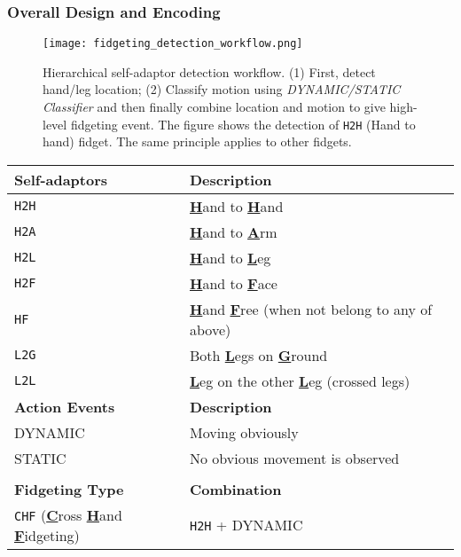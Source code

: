 \subsubsection{Overall Design and Encoding}
\begin{figure}[h]
    \centering
    \texttt{[image: fidgeting\_detection\_workflow.png]}
    \caption{Hierarchical self-adaptor detection workflow. (1) First, detect hand/leg location; (2) Classify motion using \textit{DYNAMIC/STATIC Classifier} and then finally combine location and motion to give high-level fidgeting event. The figure shows the detection of \texttt{H2H} (Hand to hand) fidget. The same principle applies to other fidgets.}
    \label{fig:fidgeting_detection_workflow}
\end{figure}
\begin{table}[]
    \centering
    \begin{tabular}{lp{4.5cm}}
\toprule
        \textbf{Self-adaptors} & \textbf{Description} \\
        \midrule
        \texttt{H2H} & \textbf{\underline H}and to \textbf{\underline H}and \\
        \texttt{H2A} & \textbf{\underline H}and to \textbf{\underline A}rm \\
        \texttt{H2L} & \textbf{\underline H}and to \textbf{\underline L}eg \\
        \texttt{H2F} & \textbf{\underline H}and to \textbf{\underline F}ace \\
        \texttt{HF} & \textbf{\underline H}and \textbf{\underline F}ree (when not belong to any of above) \\
\texttt{L2G} & Both \textbf{\underline L}egs on \textbf{\underline G}round \\
        \texttt{L2L} & \textbf{\underline L}eg on the other \textbf{\underline L}eg (crossed legs) \\
        \midrule
        \textbf{Action Events} & \textbf{Description}\\
        \midrule
        DYNAMIC & Moving obviously \\
        STATIC & No obvious movement is observed \\
        \bottomrule
        \\
\toprule
        \textbf{Fidgeting Type} & \textbf{Combination} \\
        \midrule
        \texttt{CHF} (\textbf{\underline C}ross \textbf{\underline H}and \textbf{\underline F}idgeting) & \texttt{H2H} + DYNAMIC \\

\end{tabular}
\end{table}
